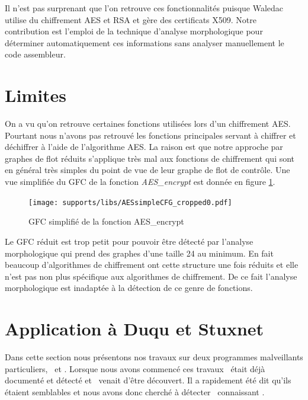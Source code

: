 Il n'est pas surprenant que l'on retrouve ces fonctionnalités puisque Waledac utilise du chiffrement AES et RSA et gère des certificats X509. Notre contribution est l'emploi de la technique d'analyse morphologique pour déterminer automatiquement ces informations sans analyser manuellement le code assembleur.

\section{Limites}
On a vu qu'on retrouve certaines fonctions utilisées lors d'un chiffrement AES.
Pourtant nous n'avons pas retrouvé les fonctions principales servant à chiffrer et déchiffrer à l'aide de l'algorithme AES.
La raison est que notre approche par graphes de flot réduits s'applique très mal aux fonctions de chiffrement qui sont en général très simples du point de vue de leur graphe de flot de contrôle.
Une vue simplifiée du GFC de la fonction \emph{AES\_encrypt} est donnée en figure \ref{fig:AES_encrypt_CFG}.

\begin{figure}[h]
\begin{center}
\texttt{[image: supports/libs/AESsimpleCFG\_cropped0.pdf]}

\end{center}
\caption{GFC simplifié de la fonction AES\_encrypt}
\label{fig:AES_encrypt_CFG}
\end{figure}

Le GFC réduit est trop petit pour pouvoir être détecté par l'analyse morphologique qui prend des graphes d'une taille 24 au minimum.
En fait beaucoup d'algorithmes de chiffrement ont cette structure une fois réduits et elle n'est pas non plus spécifique aux algorithmes de chiffrement. De ce fait l'analyse morphologique est inadaptée à la détection de ce genre de fonctions.

\section{Application à Duqu et Stuxnet}
Dans cette section nous présentons nos travaux sur deux programmes malveillants particuliers, \duqu\ et \stux.
Lorsque nous avons commencé ces travaux \stux\ était déjà documenté et détecté et \duqu\ venait d'être découvert.
Il a rapidement été dit qu'ils étaient semblables et nous avons donc cherché à détecter \duqu\ connaissant \stux.


